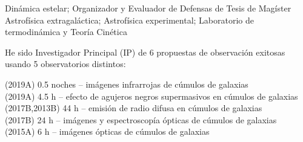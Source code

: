 \documentclass[11pt]{article}
\def\clusters{c\'umulos de galaxias}
\begin{document}
\noindent
{} Din\'amica estelar; Organizador y Evaluador de Defensas de Tesis de Mag\'ister\\
 Astrof\'isica extragal\'actica; Astrof\'isica experimental; Laboratorio de termodin\'amica y Teor\'ia Cin\'etica\\

\hline

\pagebreak



\noindent
He sido Investigador Principal (IP) de 6 propuestas de observaci\'on exitosas usando 5 observatorios distintos:

\noindent
 (2019A) 0.5 noches -- im\'agenes infrarrojas de \clusters\\
 (2019A) 4.5 h -- efecto de agujeros negros supermasivos en \clusters\\
 (2017B,2013B) 44 h -- emisi\'on de radio difusa en \clusters\\
 (2017B) 24 h -- im\'agenes y espectroscop\'ia \'opticas de \clusters\\
 (2015A) 6 h -- im\'agenes \'opticas de \clusters\\
\end{document}
